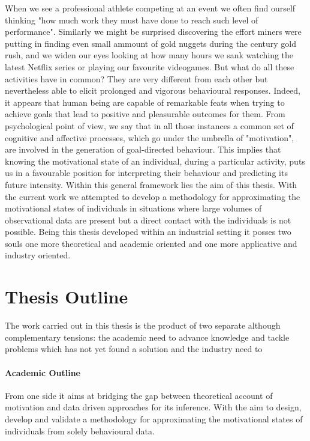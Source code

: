 When we see a professional athlete competing at an event we often find ourself thinking "how much work they must have done to reach such level of performance". Similarly we might be surprised discovering the effort miners were putting in finding even small ammount of gold nuggets during the  century gold rush, and we widen our eyes looking at how many hours we sank watching the latest Netflix series or playing our favourite videogames. But what do all these activities have in common? They are very different from each other but nevertheless able to elicit prolonged and vigorous behavioural responses. Indeed, it appears that human being are capable of remarkable feats when trying to achieve goals that lead to positive and pleasurable outcomes for them. From psychological point of view, we say that in all those instances a common set of cognitive and affective processes, which go under the umbrella of "motivation", are involved in the generation of goal-directed behaviour. This implies that knowing the motivational state of an individual, during a particular activity, puts us in a favourable position for interpreting their behaviour and predicting its future intensity. Within this general framework lies the aim of this thesis. With the current work we attempted to develop a methodology for approximating the motivational states of individuals in situations where large volumes of observational data are present but a direct contact with the individuals is not possible. Being this thesis developed within an industrial setting it posses two souls one more theoretical and academic oriented and one more applicative and industry oriented.

\section*{Thesis Outline}
The work carried out in this thesis is the product of two separate although complementary tensions: the academic need to advance knowledge and tackle problems which has not yet found a solution and the industry need to 


\paragraph*{Academic Outline}
From one side it aims at bridging the gap between theoretical account of motivation and data driven approaches for its inference. With the aim to design, develop and validate a methodology for approximating the motivational states of individuals from solely behavioural data. 
